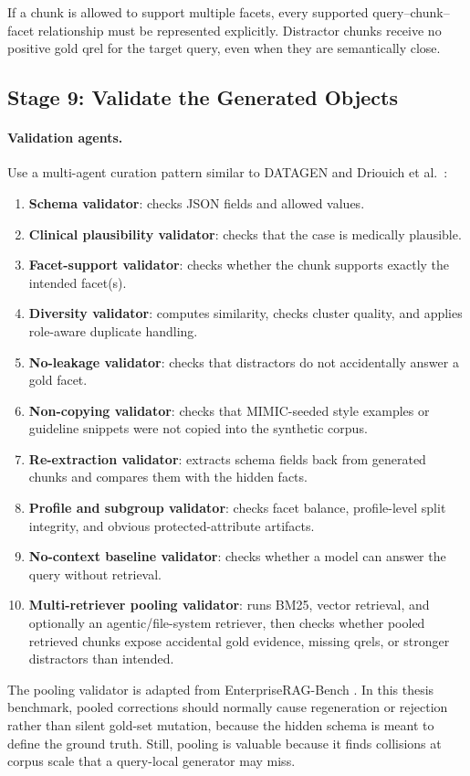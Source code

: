 \documentclass[11pt,a4paper]{article}
\newcommand{\stage}[2]{\subsection{\textcolor{betterblue}{#1}: #2}}
\begin{document}
If a chunk is allowed to support multiple facets, every supported query--chunk--facet relationship must be represented explicitly. Distractor chunks receive no positive gold qrel for the target query, even when they are semantically close.

\stage{Stage 9}{Validate the Generated Objects}

\paragraph{Validation agents.}
Use a multi-agent curation pattern similar to DATAGEN and Driouich et al.\ \citep{huang2025datagen,driouich2025diverseprivate}:

\begin{enumerate}[leftmargin=*]
	\item \textbf{Schema validator}: checks JSON fields and allowed values.
	\item \textbf{Clinical plausibility validator}: checks that the case is medically plausible.
	\item \textbf{Facet-support validator}: checks whether the chunk supports exactly the intended facet(s).
	\item \textbf{Diversity validator}: computes similarity, checks cluster quality, and applies role-aware duplicate handling.
	\item \textbf{No-leakage validator}: checks that distractors do not accidentally answer a gold facet.
	\item \textbf{Non-copying validator}: checks that MIMIC-seeded style examples or guideline snippets were not copied into the synthetic corpus.
	\item \textbf{Re-extraction validator}: extracts schema fields back from generated chunks and compares them with the hidden facts.
	\item \textbf{Profile and subgroup validator}: checks facet balance, profile-level split integrity, and obvious protected-attribute artifacts.
	\item \textbf{No-context baseline validator}: checks whether a model can answer the query without retrieval.
	\item \textbf{Multi-retriever pooling validator}: runs BM25, vector retrieval, and optionally an agentic/file-system retriever, then checks whether pooled retrieved chunks expose accidental gold evidence, missing qrels, or stronger distractors than intended.
\end{enumerate}

The pooling validator is adapted from EnterpriseRAG-Bench \citep{sun2026enterpriseragbench}. In this thesis benchmark, pooled corrections should normally cause regeneration or rejection rather than silent gold-set mutation, because the hidden schema is meant to define the ground truth. Still, pooling is valuable because it finds collisions at corpus scale that a query-local generator may miss.
\end{document}
